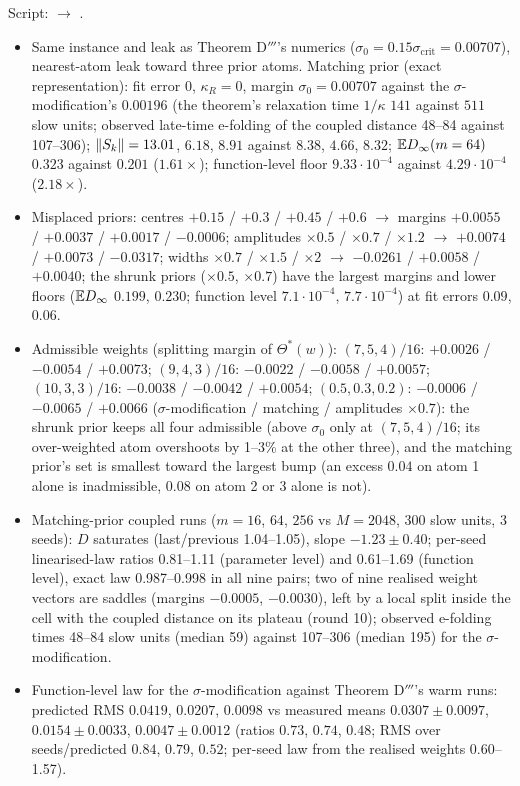 Script:  $\to$ .
\begin{itemize}
  \item Same instance and leak as Theorem D$'''$'s numerics ($\sigma_0=0.15\sigma_{\mathrm{crit}}=0.00707$),
    nearest-atom leak toward three prior atoms. Matching prior (exact representation): fit error $0$, $\kappa_R=0$,
    margin $\sigma_0=0.00707$ against the $\sigma$-modification's $0.00196$ (the theorem's relaxation time
    $1/\kappa$ $141$ against $511$ slow units; observed late-time e-folding of the coupled distance 48--84 against
    107--306); $\lVert S_k\rVert=13.01$, $6.18$, $8.91$ against $8.38$, $4.66$, $8.32$; $\mathbb{E} D_\infty(m=64)$ $0.323$
    against $0.201$ ($1.61\times$); function-level floor $9.33\cdot10^{-4}$ against $4.29\cdot10^{-4}$
    ($2.18\times$).
  \item Misplaced priors: centres $+0.15$ / $+0.3$ / $+0.45$ / $+0.6$ $\to$ margins
    $+0.0055$ / $+0.0037$ / $+0.0017$ / $-0.0006$; amplitudes $\times0.5$ / $\times0.7$ / $\times1.2$ $\to$
    $+0.0074$ / $+0.0073$ / $-0.0317$; widths $\times0.7$ / $\times1.5$ / $\times2$ $\to$ $-0.0261$ / $+0.0058$ / $+0.0040$;
    the shrunk priors ($\times0.5$, $\times0.7$) have the largest margins and lower floors ($\mathbb{E} D_\infty$ $0.199$,
    $0.230$; function level $7.1\cdot10^{-4}$, $7.7\cdot10^{-4}$) at fit errors $0.09$, $0.06$.
  \item Admissible weights (splitting margin of $\Theta^*(w)$): $(7,5,4)/16$: $+0.0026$ / $-0.0054$ / $+0.0073$;
    $(9,4,3)/16$: $-0.0022$ / $-0.0058$ / $+0.0057$; $(10,3,3)/16$: $-0.0038$ / $-0.0042$ / $+0.0054$;
    $(0.5,0.3,0.2)$: $-0.0006$ / $-0.0065$ / $+0.0066$ ($\sigma$-modification / matching / amplitudes
    $\times0.7$): the shrunk prior keeps all four admissible (above $\sigma_0$ only at $(7,5,4)/16$; its
    over-weighted atom overshoots by 1--3\% at the other three), and the matching prior's set is smallest toward
    the largest bump (an excess $0.04$ on atom 1 alone is inadmissible, $0.08$ on atom 2 or 3 alone is not).
  \item Matching-prior coupled runs ($m=16$, $64$, $256$ vs $M=2048$, 300 slow units, 3 seeds): $D$ saturates
    (last/previous 1.04--1.05), slope $-1.23\pm0.40$; per-seed linearised-law ratios 0.81--1.11 (parameter level)
    and 0.61--1.69 (function level), exact law 0.987--0.998 in all nine pairs; two of nine realised weight vectors
    are saddles (margins $-0.0005$, $-0.0030$), left by a local split inside the cell with the coupled distance on
    its plateau (round 10); observed e-folding times 48--84 slow units (median 59) against 107--306 (median 195)
    for the $\sigma$-modification.
  \item Function-level law for the $\sigma$-modification against Theorem D$'''$'s warm runs: predicted RMS
    $0.0419$, $0.0207$, $0.0098$ vs measured means $0.0307\pm0.0097$, $0.0154\pm0.0033$, $0.0047\pm0.0012$ (ratios
    $0.73$, $0.74$, $0.48$; RMS over seeds/predicted $0.84$, $0.79$, $0.52$; per-seed law from the realised weights
    0.60--1.57).
\end{itemize}

